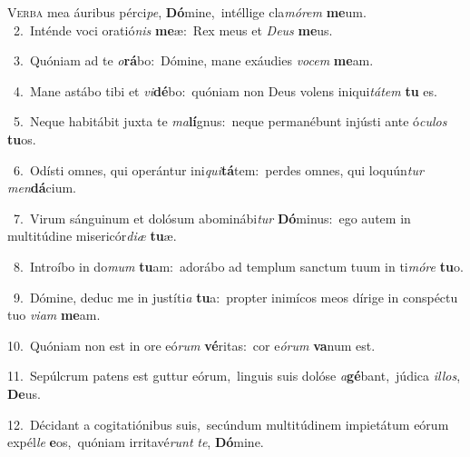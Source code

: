 \lettrine{\initial\textcolor{\initialcolor}{V}}{erba} mea áuribus pérci\-\textit{pe}\-, \textbf{Dó}\-mine,~\star intéllige cla\-\textit{mó}\-\textit{rem} \textbf{me}\-um.\\
{\numbfont\textcolor{\numbcolor}{~2.}}~Inténde voci oratió\textit{nis} \textbf{me}\-æ:~\star Rex meus et \textit{De}\-\textit{us} \textbf{me}\-us.\par
{\numbfont\textcolor{\numbcolor}{~3.}}~Quóniam ad te \textit{o}\-\textbf{rá}bo:~\star Dómine, mane exáudies \textit{vo}\-\textit{cem} \textbf{me}\-am.\par
{\numbfont\textcolor{\numbcolor}{~4.}}~Mane astábo tibi et \textit{vi}\-\textbf{dé}bo:~\star quóniam non Deus volens iniqui\-\textit{tá}\-\textit{tem} \textbf{tu} es.\par
{\numbfont\textcolor{\numbcolor}{~5.}}~Neque habitábit juxta te \textit{ma}\-\textbf{lí}gnus:~\star neque permanébunt injústi ante ó\-\textit{cu}\-\textit{los} \textbf{tu}\-os.\par
{\numbfont\textcolor{\numbcolor}{~6.}}~Odísti omnes, qui operántur ini\-\textit{qui}\-\textbf{tá}tem:~\star perdes omnes, qui loquún\textit{tur} \textit{men}\-\textbf{dá}cium.\par
{\numbfont\textcolor{\numbcolor}{~7.}}~Virum sánguinum et dolósum abominábi\textit{tur} \textbf{Dó}\-minus:~\star ego autem in multitúdine misericór\-\textit{di}\-\textit{æ} \textbf{tu}\-æ.\par
{\numbfont\textcolor{\numbcolor}{~8.}}~Introíbo in do\textit{mum} \textbf{tu}\-am:~\star adorábo ad templum sanctum tuum in ti\-\textit{mó}\-\textit{re} \textbf{tu}\-o.\par
{\numbfont\textcolor{\numbcolor}{~9.}}~Dómine, deduc me in justíti\textit{a} \textbf{tu}\-a:~\star propter inimícos meos dírige in conspéctu tuo \textit{vi}\-\textit{am} \textbf{me}\-am.\par
{\numbfont\textcolor{\numbcolor}{10.}}~Quóniam non est in ore eó\textit{rum} \textbf{vé}\-ritas:~\star cor e\-\textit{ó}\-\textit{rum} \textbf{va}\-num est.\par
{\numbfont\textcolor{\numbcolor}{11.}}~Sepúlcrum patens est guttur eórum,~\dagger linguis suis dolóse \textit{a}\-\textbf{gé}bant,~\star júdica \textit{il}\-\textit{los}, \textbf{De}\-us.\par
{\numbfont\textcolor{\numbcolor}{12.}}~Décidant a cogitatiónibus suis,~\dagger secúndum multitúdinem impietátum eórum expél\textit{le} \textbf{e}\-os,~\star quóniam irritavé\textit{runt} \textit{te}\-, \textbf{Dó}\-mine.\par
